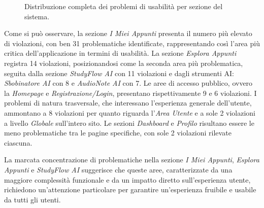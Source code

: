 \begin{figure}[H]
  \centering
  \caption{Distribuzione completa dei problemi di usabilità per sezione del sistema.}
  \label{fig:violazioni-sezioni-sito}
\end{figure}

Come si può osservare, la sezione \textit{I Miei Appunti} presenta il numero più elevato di violazioni, con ben 31 problematiche identificate, rappresentando così l'area più critica dell'applicazione in termini di usabilità.
La sezione \textit{Esplora Appunti} registra 14 violazioni, posizionandosi come la seconda area più problematica, seguita dalla sezione \textit{StudyFlow AI} con 11 violazioni e dagli strumenti AI: \textit{Sbobinatore AI} con 8 e \textit{AudioNote AI} con 7.
Le aree di accesso pubblico, ovvero la \textit{Homepage} e \textit{Registrazione/Login}, presentano rispettivamente 9 e 6 violazioni.
I problemi di natura trasversale, che interessano l'esperienza generale dell'utente, ammontano a 8 violazioni per quanto riguarda l'\textit{Area Utente} e a sole 2 violazioni a livello \textit{Globale} sull'intero sito.
Le sezioni \textit{Dashboard} e \textit{Profilo} risultano essere le meno problematiche tra le pagine specifiche, con sole 2 violazioni rilevate ciascuna.

La marcata concentrazione di problematiche nella sezione \textit{I Miei Appunti}, \textit{Esplora Appunti} e \textit{StudyFlow AI} suggerisce che queste aree, caratterizzate da una maggiore complessità funzionale e da un impatto diretto sull'esperienza utente, richiedono un'attenzione particolare per garantire un'esperienza fruibile e usabile da tutti gli utenti.